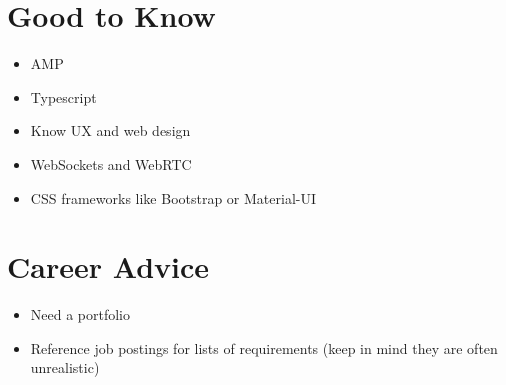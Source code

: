 \documentclass[12pt]{article}
\begin{document}
\section{Good to Know}

\begin{itemize}
\item AMP
\item Typescript
\item Know UX and web design
\item WebSockets and WebRTC
\item CSS frameworks like Bootstrap or Material-UI
\end{itemize}

\section{Career Advice}

\begin{itemize}
\item Need a portfolio
\item Reference job postings for lists of requirements (keep in mind they are often unrealistic)
\end{itemize}
\end{document}

